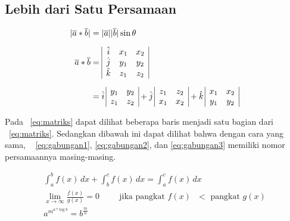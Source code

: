 \subsection{Lebih dari Satu Persamaan}
\label{sec:multiEqu}
\noindent \begin{align}\label{eq:matriks}	
	|\overline{a} * \overline{b}| &= |\overline{a}| |\overline{b}| \sin\theta 
	\\[0.2cm]
	\overline{a} * \overline{b} &=  
	\begin{array}{| c c c |}
		\hat{i} & x_{1} & x_{2} \\
		\hat{j} & y_{1} & y_{2} \\
		\hat{k} & z_{1} & z_{2} \\
	\end{array} \nonumber \\[0.2cm]
	&= \hat{i} \,
	\begin{array}{ | c c | }
		y_{1} & y_{2} \\
		z_{1} & z_{2} \\
	\end{array} 
	+ \hat{j} \,
	\begin{array}{ | c c | }
		z_{1} & z_{2} \\
		x_{1} & x_{2} \\
	\end{array} 
	+ \hat{k} \,	
	\begin{array}{ | c c | }
		x_{1} & x_{2} \\
		y_{1} & y_{2} \\
	\end{array}
	\nonumber
\end{align}

Pada \equ~\ref{eq:matriks} dapat dilihat beberapa baris menjadi satu bagian 
dari \equ~\ref{eq:matriks}. 
Sedangkan dibawah ini dapat dilihat bahwa dengan cara yang sama, \equ~
\ref{eq:gabungan1}, \ref{eq:gabungan2}, dan \ref{eq:gabungan3} memiliki nomor 
persamaannya masing-masing. 

\noindent \begin{align}\label{eq:gabungan1}	
	\int_{a}^{b} f(x)\, dx + \int_{b}^{c} f(x) \, dx = \int_{a}^{c} f(x) \, dx
	\\\label{eq:gabungan2}
	\lim_{x \to \infty} \frac{f(x)}{g(x)} = 0 \hspace{1cm} 
	\text{jika pangkat $f(x)$ $<$ pangkat $g(x)$} \\\label{eq:gabungan3}
	a^{m^{a \, ^{n}\log b }} = b^{\frac{m}{n}}
\end{align}



